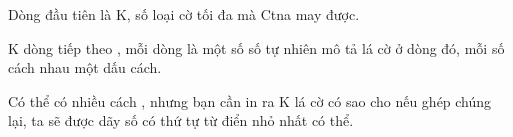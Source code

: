 Dòng đầu tiên là K, số loại cờ tối đa mà Ctna may được.

K dòng tiếp theo , mỗi dòng là một số số tự nhiên mô tả lá cờ ở dòng đó, mỗi số cách nhau một dấu cách.

Có thể có nhiều cách , nhưng bạn cần in ra K lá cờ có sao cho nếu ghép chúng lại, ta sẽ được dãy số có thứ tự từ điển nhỏ nhất có thể.